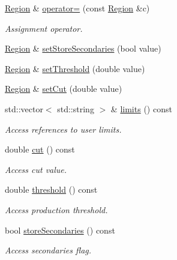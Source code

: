 \begin{DoxyCompactItemize}
\hyperlink{class_d_d4hep_1_1_geometry_1_1_region}{Region} \& \hyperlink{class_d_d4hep_1_1_geometry_1_1_region_acd0e2208ce7854c4dead0764782cace9}{operator=} (const \hyperlink{class_d_d4hep_1_1_geometry_1_1_region}{Region} \&c)
\begin{DoxyCompactList}\small\item\em Assignment operator. \item\end{DoxyCompactList}\item 
\hyperlink{class_d_d4hep_1_1_geometry_1_1_region}{Region} \& \hyperlink{class_d_d4hep_1_1_geometry_1_1_region_a491be77e5c4a5098fa1ae6acb8fac442}{setStoreSecondaries} (bool value)
\item 
\hyperlink{class_d_d4hep_1_1_geometry_1_1_region}{Region} \& \hyperlink{class_d_d4hep_1_1_geometry_1_1_region_a29293fa51db7f4469c51a7638a77043a}{setThreshold} (double value)
\item 
\hyperlink{class_d_d4hep_1_1_geometry_1_1_region}{Region} \& \hyperlink{class_d_d4hep_1_1_geometry_1_1_region_ae4510bd7a92f89b49d161c67475c0350}{setCut} (double value)
\item 
std::vector$<$ std::string $>$ \& \hyperlink{class_d_d4hep_1_1_geometry_1_1_region_a4507ab6d77f4775c83644aa117f5ef0b}{limits} () const 
\begin{DoxyCompactList}\small\item\em Access references to user limits. \item\end{DoxyCompactList}\item 
double \hyperlink{class_d_d4hep_1_1_geometry_1_1_region_abdf2193e4fc5f8da3a001f36338b6d4e}{cut} () const 
\begin{DoxyCompactList}\small\item\em Access cut value. \item\end{DoxyCompactList}\item 
double \hyperlink{class_d_d4hep_1_1_geometry_1_1_region_a4fee8a2258250ccb8e17c72964d2eaf7}{threshold} () const 
\begin{DoxyCompactList}\small\item\em Access production threshold. \item\end{DoxyCompactList}\item 
bool \hyperlink{class_d_d4hep_1_1_geometry_1_1_region_a1f08466c4f3e0135dd3aaf8684aae623}{storeSecondaries} () const 
\begin{DoxyCompactList}\small\item\em Access secondaries flag. \item\end{DoxyCompactList}\end{DoxyCompactItemize}


